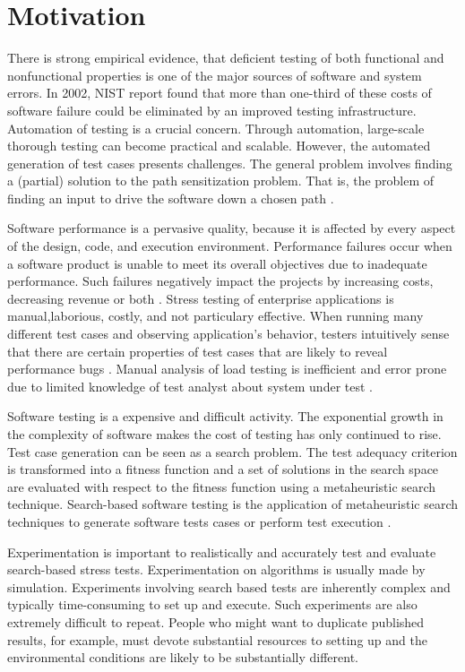 \documentclass{report}
\begin{document}
\section{Motivation}

There is strong empirical evidence, that deficient
testing of both functional and nonfunctional properties
is one of the major sources of software and system errors. In 2002, NIST  report found that more than one-third of these costs of software failure could be eliminated by an improved testing infrastructure.
Automation of testing is a crucial concern. Through
automation, large-scale thorough testing can become
practical and scalable. However, the automated generation of test cases presents challenges. The general problem involves finding a (partial) solution to the path sensitization problem. That is, the problem of finding an input to drive the software down a chosen path \cite{Harman2010} \cite{dean2003managing}.

Software performance is a pervasive quality, because it is affected by every aspect of the design, code, and execution environment. Performance failures occur when a software product is unable to meet its overall objectives due to inadequate performance. Such failures negatively impact the projects by increasing costs, decreasing revenue or both \cite{Vetoio2011}. Stress testing of enterprise applications is manual,laborious, costly, and not particulary effective. When running many different test cases and observing application’s behavior, testers intuitively sense that there are certain properties of test cases that are likely to reveal performance bugs \cite{Grechanik2012}. Manual analysis of load testing is inefficient and error prone due to limited knowledge of test analyst about system under test \cite{Arslan2015}.

Software testing is a expensive and difficult activity. The exponential
growth in the complexity of software makes the cost of testing has only continued to rise. Test case generation can be seen as a search problem. The test adequacy criterion is transformed into a fitness function and a set of solutions in the search
space are evaluated with respect to the fitness function using a metaheuristic search technique. Search-based software testing is the application of metaheuristic search techniques to generate software
tests cases or perform test execution \cite{Afzal2009a} \cite{Gay}.

Experimentation is important to realistically and accurately test and evaluate search-based stress tests. Experimentation on algorithms is usually made by simulation. Experiments involving search based tests are inherently complex and typically time-consuming to set up and execute. Such experiments are also extremely difficult to repeat. People who might want to duplicate published results, for example, must devote substantial resources to setting up and the environmental conditions are likely to be substantially different.
\end{document}

